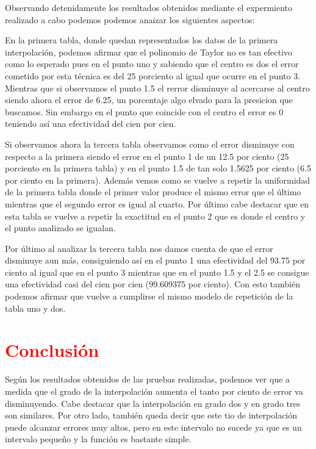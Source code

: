 \documentclass[a4paper,12pt]{article}
\begin{document}
Observando detenidamente los resultados obtenidos mediante el expermiento realizado a cabo podemos podemos anaizar los siguientes aspectos:

En la primera tabla, donde quedan representados los datos de la primera interpolación, podemos afirmar
que el polinomio de Taylor no es tan efectivo como lo esperado pues en el punto uno y sabiendo que el 
centro es dos el error cometido por esta técnica es del 25 porciento al igual que ocurre
en el punto 3. Mientras que si observamos el punto 1.5 el rerror disminuye al acercarse al centro siendo
ahora el error de 6.25, un porcentaje algo elvado para la presicion que buscamos. Sin embargo en el punto que coincide
con el centro el error es 0 teniendo así una efectividad del cien por cien. 

Si observamos ahora la tercera tabla observamos como el error disminuye con respecto a la primera
siendo el error en el punto 1 de un 12.5 por ciento (25 porciento en la primera tabla) y en el 
punto 1.5 de tan solo 1.5625 por ciento (6.5 por ciento en la primera). Además vemos como se vuelve 
a repetir la uniformidad de la primera tabla donde el primer valor produce el mismo error que el último
mientras que el segundo error es igual al cuarto. Por último cabe destacar que en esta tabla
se vuelve a repetir la exactitud en el punto 2 que es donde el centro y el punto analizado se 
igualan. 

Por último al analizar la tercera tabla nos damos cuenta de que el error disminuye aun más, consiguiendo así 
en el punto 1 una efectividad del 93.75 por ciento al igual que en el punto 3 mientras que en el punto 1.5 y el 
2.5 se consigue una efectividad casi del cien por cien (99.609375 por ciento). Con esto también podemos afirmar
que vuelve a cumplirse el mismo modelo de repetición de la tabla uno y dos.




\newpage
\section{\textcolor{red}{Conclusión}}
Según los resultados obtenidos de las pruebas realizadas, podemos ver que a medida que el grado de la interpolación aumenta el tanto por ciento de error va disminuyendo. 
Cabe destacar que la interpolación en grado dos y en grado tres son similares.
Por otro lado, también queda decir que este tio de interpolación puede alcanzar errores muy altos, pero en este intervalo no sucede ya que es un intervalo pequeño y la función es bastante simple.
\end{document}
